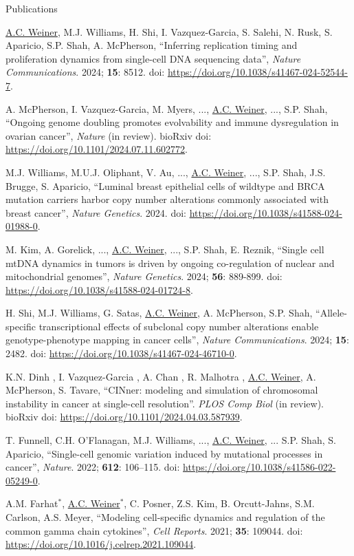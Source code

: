 \documentclass{resume} %
\begin{document}
\begin{rSection}{Publications}

\underline{A.C. Weiner}, M.J. Williams, H. Shi, I. Vazquez-Garcia, S. Salehi, N. Rusk, S. Aparicio, S.P. Shah, A. McPherson, ``Inferring replication timing and proliferation dynamics from single-cell DNA sequencing data'', \textit{Nature Communications}. 2024; \textbf{15}: 8512. doi: \url{https://doi.org/10.1038/s41467-024-52544-7}.

A. McPherson, I. Vazquez-Garcia, M. Myers, ..., \underline{A.C. Weiner}, ..., S.P. Shah, ``Ongoing genome doubling promotes evolvability and immune dysregulation in ovarian cancer'', \textit{Nature} (in review). bioRxiv doi: \url{https://doi.org/10.1101/2024.07.11.602772}.

M.J. Williams, M.U.J. Oliphant, V. Au, ..., \underline{A.C. Weiner}, ..., S.P. Shah, J.S. Brugge, S. Aparicio, ``Luminal breast epithelial cells of wildtype and BRCA mutation carriers harbor copy number alterations commonly associated with breast cancer'', \textit{Nature Genetics}. 2024. doi: \url{https://doi.org/10.1038/s41588-024-01988-0}.

M. Kim, A. Gorelick, ..., \underline{A.C. Weiner}, ..., S.P. Shah, E. Reznik, ``Single cell mtDNA dynamics in tumors is driven by ongoing co-regulation of nuclear and mitochondrial genomes'', \textit{Nature Genetics}. 2024; \textbf{56}: 889-899. doi: \url{https://doi.org/10.1038/s41588-024-01724-8}.

H. Shi, M.J. Williams, G. Satas, \underline{A.C. Weiner}, A. McPherson, S.P. Shah, ``Allele-specific transcriptional effects of subclonal copy number alterations enable genotype-phenotype mapping in cancer cells'', \textit{Nature Communications}. 2024; \textbf{15}: 2482. doi: \url{https://doi.org/10.1038/s41467-024-46710-0}.

K.N. Dinh , I. Vazquez-Garcia , A. Chan , R. Malhotra , \underline{A.C. Weiner}, A. McPherson, S. Tavare, ``CINner: modeling and simulation of chromosomal instability in cancer at single-cell resolution''. \textit{PLOS Comp Biol} (in review). bioRxiv doi: \url{https://doi.org/10.1101/2024.04.03.587939}.

T. Funnell, C.H. O'Flanagan, M.J. Williams, ..., \underline{A.C. Weiner}, ... S.P. Shah, S. Aparicio, ``Single-cell genomic variation induced by mutational processes in cancer'', \textit{Nature}. 2022; \textbf{612}: 106–115. doi: \url{https://doi.org/10.1038/s41586-022-05249-0}.


A.M. Farhat$^{\ast}$, \underline{A.C. Weiner}$^{\ast}$, C. Posner, Z.S. Kim, B. Orcutt-Jahns, S.M. Carlson, A.S. Meyer, ``Modeling cell-specific dynamics and regulation of the common gamma chain cytokines'', \textit{Cell Reports}. 2021; \textbf{35}: 109044. doi: \url{https://doi.org/10.1016/j.celrep.2021.109044}.


\end{rSection}
\end{document}
